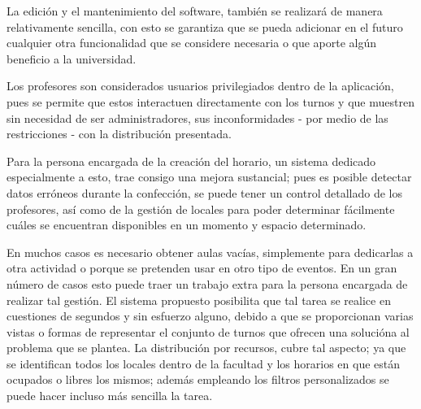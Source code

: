 \begin{introduction}
	La edición y el mantenimiento del software, también se realizará de manera relativamente sencilla, con esto se garantiza que se pueda adicionar en el futuro cualquier otra funcionalidad que se considere necesaria o que aporte algún beneficio a la universidad. 
	
	Los profesores son considerados usuarios privilegiados dentro de la aplicación, pues se permite que estos interactuen directamente con los turnos y que muestren sin necesidad de ser administradores, sus inconformidades - por medio de las restricciones -  con la distribución presentada.
	
	Para la persona encargada de la creación del horario, un sistema dedicado especialmente a esto, trae consigo una mejora sustancial; pues es posible detectar datos erróneos durante la confección, se puede tener un control detallado de los profesores, así como de la gestión de locales para poder determinar fácilmente cuáles se encuentran disponibles en un momento y espacio determinado.
	
	En muchos casos es necesario obtener aulas vacías, simplemente para dedicarlas a otra actividad o porque se pretenden usar en otro tipo de eventos. En un gran número de casos esto puede traer un trabajo extra para la persona encargada de realizar tal gestión. El sistema propuesto posibilita que tal tarea se realice en cuestiones de segundos y sin esfuerzo alguno, debido a que se proporcionan varias vistas o formas de representar el conjunto de turnos que ofrecen una solucióna al problema que se plantea. La distribución por recursos, cubre tal aspecto; ya que se identifican todos los locales dentro de la facultad y los horarios en que están ocupados o libres los mismos; además empleando los filtros personalizados se puede hacer incluso más sencilla la tarea.

	

\end{introduction}

